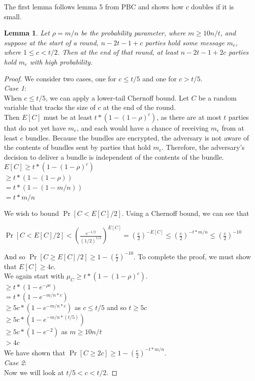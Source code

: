 \documentclass{article}
\newtheorem{lemma}{Lemma}
\begin{document}
The first lemma follows lemma 5 from PBC and shows how $c$ doubles if it is small.
\begin{lemma}
Let $\rho = m / n$ be the probability parameter, where $m \geq 10n/t$, and suppose at the start of a round, $n - 2t - 1 + c$ parties hold some message $m_e$, where $1 \leq c < t/2$. Then at the end of that round, at least $n - 2t - 1 + 2c$ parties hold $m_e$ with high probability.
\end{lemma}
\begin{proof}
We consider two cases, one for $c \leq t/5$ and one for $c > t/5$.\\
\emph{Case 1}: \\
When $c \leq t/5$, we can apply a lower-tail Chernoff bound. Let $C$ be a random variable that tracks the size of $c$ at the end of the round.\\
Then $E[C]$ must be at least $t * (1 - (1 - \rho)^{c})$, as there are at most $t$ parties that do not yet have $m_e$, and each would have a chance of receiving $m_e$ from at least $c$ bundles. Because the bundles are encrypted, the adversary is not aware of the contents of bundles sent by parties that hold $m_e$. Therefore, the adversary's decision to deliver a bundle is independent of the contents of the bundle. \\
$E[C] \geq t * (1 - (1 - \rho)^{c})$\\
$\geq t * (1 - (1 - \rho))$\\
$=t * (1 - (1 - m/n))$\\
$=t * m/n$

We wish to bound $\Pr[C < E[C]/2]$. Using a Chernoff bound, we can see that 
\begin{center}
$\Pr[C < E[C]/2] < (\frac{e^{-1/2}}{(1/2)^{1/2}})^{E[C]} = (\frac{e}{2})^{-E[C]} \leq (\frac{e}{2})^{-t*m/n} \leq (\frac{e}{2})^{-10}$
\end{center}

And so $\Pr[C \geq E[C]/2] \geq 1 - (\frac{e}{2})^{-10}$. To complete the proof, we must show that $E[C] \geq 4c$.\\
We again start with $\mu_C \geq t * (1 - (1 - \rho)^{c})$.\\
$\geq t * (1 - e^{-\rho c})$\\
$= t * (1 - e^{-m/n *c})$\\
$\geq 5c * (1 - e^{-m/n*c})$ as $c \leq t/5$ and so $t \geq 5c$\\
$\geq 5c * (1 - e^{-m/n * (t/5)})$\\
$\geq 5c * (1 - e^{-2})$ as $m \geq 10n/t$\\
$> 4c$\\
We have shown that $\Pr[C \geq 2c] \geq 1 - (\frac{e}{2})^{-t*m/n} $.\\
\emph{Case 2}: \\
Now we will look at $t/5 < c < t/2$.


\end{proof}
\end{document}
